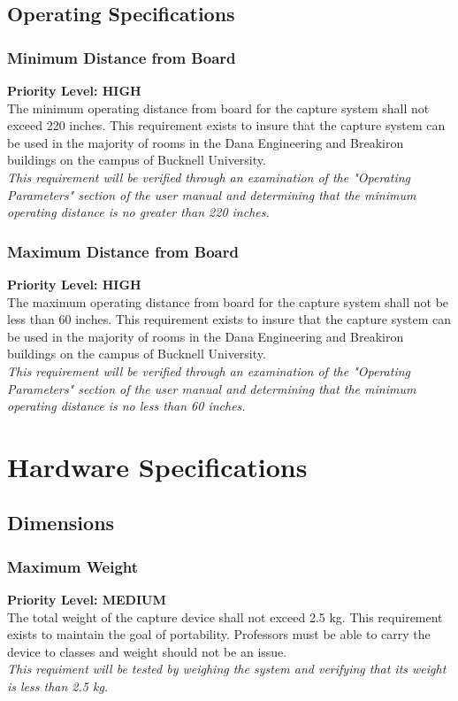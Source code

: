 \documentclass[]{article}
\begin{document}
	
		\subsection{Operating Specifications}
			
			\subsubsection{Minimum Distance from Board}
				\textbf{Priority Level: HIGH}\\
				The minimum operating distance from board for the capture system shall not exceed 220 inches. This requirement exists to insure that the capture system can be used in the majority of rooms in the Dana Engineering and Breakiron buildings on the campus of Bucknell University.\\
				\emph{This requirement will be verified through an examination of the "Operating Parameters" section of the user manual and determining that the minimum operating distance is no greater than 220 inches.}
				
			
			\subsubsection{Maximum Distance from Board}
				\textbf{Priority Level: HIGH}\\
				The maximum operating distance from board for the capture system shall not be less than 60 inches. This requirement exists to insure that the capture system can be used in the majority of rooms in the Dana Engineering and Breakiron buildings on the campus of Bucknell University.\\
				\emph{This requirement will be verified through an examination of the "Operating Parameters" section of the user manual and determining that the minimum operating distance is no less than 60 inches.}
			
				
			
	
	\section{Hardware Specifications}
		
		\subsection{Dimensions}
			
			\subsubsection{Maximum Weight}
				\textbf{Priority Level: MEDIUM}\\
				The total weight of the capture device shall not exceed 2.5 kg. This requirement exists to maintain the goal of portability. Professors must be able to carry the device to classes and weight should not be an issue. \\
				\emph{This requiment will be tested by weighing the system and verifying that its weight is less than 2.5 kg.}
				
\end{document}
